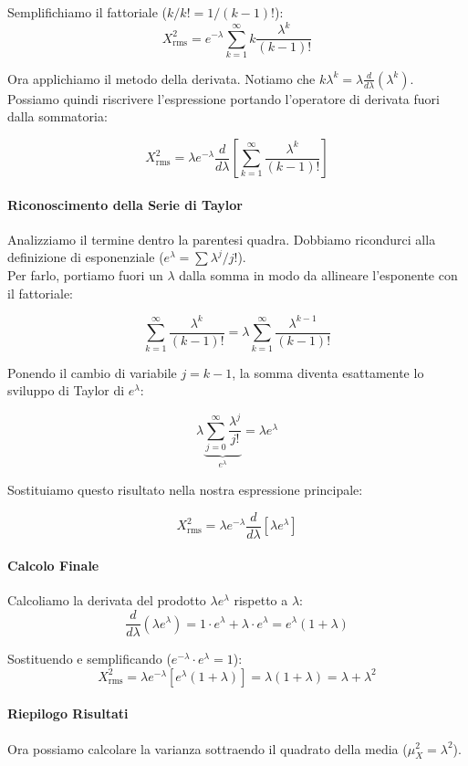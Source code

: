 Semplifichiamo il fattoriale ($k/k! = 1/(k-1)!$):
\[
X^2_{\text{rms}} = e^{-\lambda} \sum_{k=1}^{\infty} k \frac{\lambda^k}{(k-1)!}
\]

Ora applichiamo il metodo della derivata. Notiamo che $k \lambda^k = \lambda \frac{d}{d\lambda}(\lambda^k)$. Possiamo quindi riscrivere l'espressione portando l'operatore di derivata fuori dalla sommatoria:

\[
X^2_{\text{rms}} = \lambda e^{-\lambda} \frac{d}{d\lambda} \left[ \sum_{k=1}^{\infty} \frac{\lambda^k}{(k-1)!} \right]
\]

\paragraph{Riconoscimento della Serie di Taylor}
Analizziamo il termine dentro la parentesi quadra. Dobbiamo ricondurci alla definizione di esponenziale ($e^\lambda = \sum \lambda^j/j!$).
\\Per farlo, portiamo fuori un $\lambda$ dalla somma in modo da allineare l'esponente con il fattoriale:

\[
\sum_{k=1}^{\infty} \frac{\lambda^k}{(k-1)!} = \lambda \sum_{k=1}^{\infty} \frac{\lambda^{k-1}}{(k-1)!}
\]

Ponendo il cambio di variabile $j = k-1$, la somma diventa esattamente lo sviluppo di Taylor di $e^\lambda$:

\[
\lambda \underbrace{\sum_{j=0}^{\infty} \frac{\lambda^j}{j!}}_{e^\lambda} = \lambda e^\lambda
\]

Sostituiamo questo risultato nella nostra espressione principale:

\[
X^2_{\text{rms}} = \lambda e^{-\lambda} \frac{d}{d\lambda} \left[ \lambda e^\lambda \right]
\]

\paragraph{Calcolo Finale}
Calcoliamo la derivata del prodotto $\lambda e^\lambda$ rispetto a $\lambda$:
\[
\frac{d}{d\lambda} (\lambda e^\lambda) = 1 \cdot e^\lambda + \lambda \cdot e^\lambda = e^\lambda(1 + \lambda)
\]

Sostituendo e semplificando ($e^{-\lambda} \cdot e^\lambda = 1$):
\[
X^2_{\text{rms}} = \lambda e^{-\lambda} [ e^\lambda(1 + \lambda) ] = \lambda (1 + \lambda) = \lambda + \lambda^2
\]

\paragraph{Riepilogo Risultati}
Ora possiamo calcolare la varianza sottraendo il quadrato della media ($\mu_X^2 = \lambda^2$).

